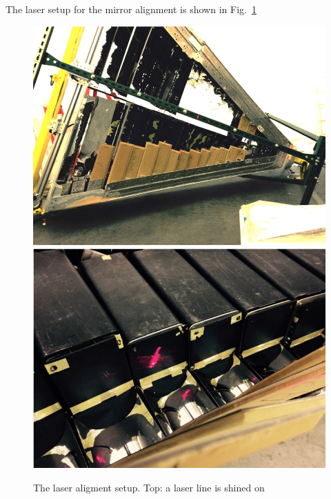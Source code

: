 The laser setup for the mirror alignment is shown in Fig.~\ref{fig:laserAlignment}

\begin{figure}[h]
\centering
	\includegraphics[width=0.95\columnwidth, keepaspectratio]{img/laserAlignment1.png}
	\includegraphics[width=0.95\columnwidth, keepaspectratio]{img/laserAlignment2.png}
\caption{The laser aligment setup. Top: a laser line is shined on }
	\label{fig:laserAlignment}
\end{figure}
